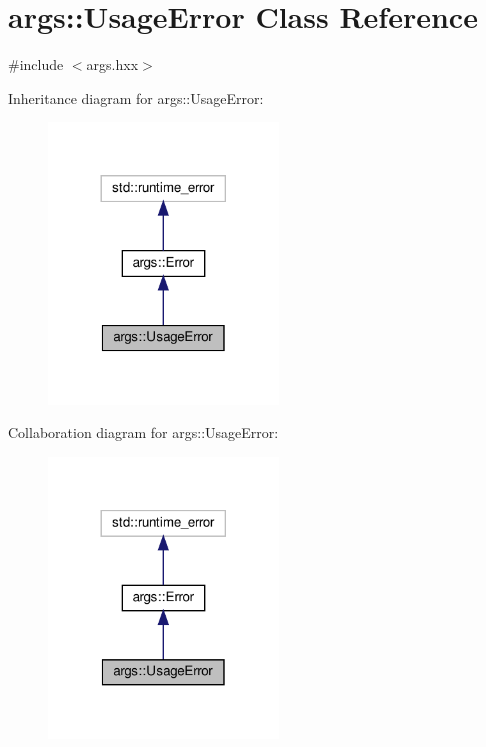 \hypertarget{classargs_1_1_usage_error}{}\section{args\+:\+:Usage\+Error Class Reference}
\label{classargs_1_1_usage_error}


{\ttfamily \#include $<$args.\+hxx$>$}



Inheritance diagram for args\+:\+:Usage\+Error\+:\nopagebreak
\begin{figure}[H]
\begin{center}
\leavevmode
\includegraphics[width=173pt]{classargs_1_1_usage_error__inherit__graph}
\end{center}
\end{figure}


Collaboration diagram for args\+:\+:Usage\+Error\+:\nopagebreak
\begin{figure}[H]
\begin{center}
\leavevmode
\includegraphics[width=173pt]{classargs_1_1_usage_error__coll__graph}
\end{center}
\end{figure}
